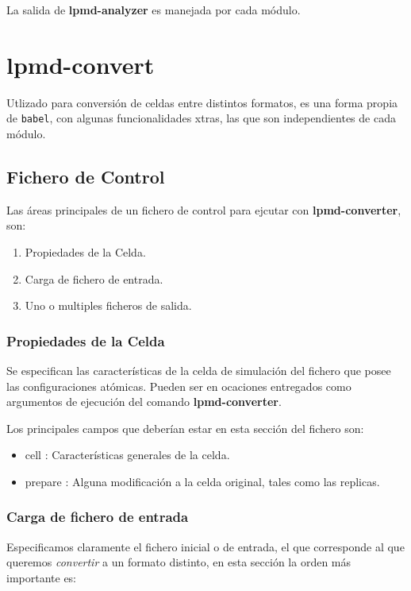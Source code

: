 
La salida de \textbf{lpmd-analyzer} es manejada por cada m\'odulo.

\section{lpmd-convert}

Utlizado para conversi\'on de celdas entre distintos formatos, es una forma propia de \verb|babel|, con algunas funcionalidades xtras, las que son independientes de cada m\'odulo.

\subsection{Fichero de Control}
Las \'areas principales de un fichero de control para ejcutar con \textbf{lpmd-converter}, son:

\begin{enumerate}
 \item Propiedades de la Celda.
 \item Carga de fichero de entrada.
 \item Uno o multiples ficheros de salida.
\end{enumerate}

\subsubsection{Propiedades de la Celda}
Se especifican las caracter\'isticas de la celda de simulaci\'on del fichero que posee las configuraciones at\'omicas. Pueden ser en ocaciones entregados como argumentos de ejecuci\'on del comando \textbf{lpmd-converter}.

Los principales campos que deber\'ian estar en esta secci\'on del fichero son:
\begin{itemize}
 \item cell : Caracter\'isticas generales de la celda.
 \item prepare : Alguna modificaci\'on a la celda original, tales como las replicas.
\end{itemize}
\subsubsection{Carga de fichero de entrada}
Especificamos claramente el fichero inicial o de entrada, el que corresponde al que queremos \textit{convertir} a un formato distinto, en esta secci\'on la orden m\'as importante es:

